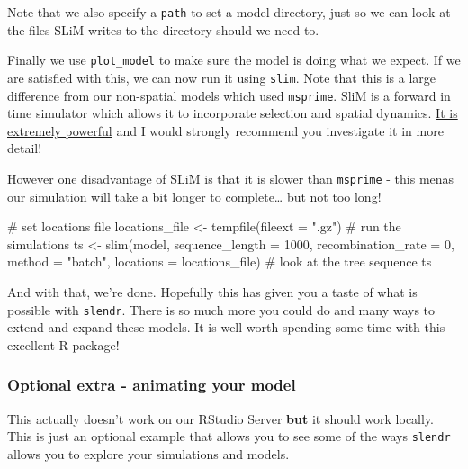 \documentclass[
  letterpaper,
  DIV=11,
  numbers=noendperiod]{scrartcl}
\newenvironment{Shaded}{\begin{snugshade}}{\end{snugshade}}
\newcommand{\AttributeTok}[1]{\textcolor[rgb]{0.40,0.45,0.13}{#1}}
\newcommand{\CommentTok}[1]{\textcolor[rgb]{0.37,0.37,0.37}{#1}}
\newcommand{\DecValTok}[1]{\textcolor[rgb]{0.68,0.00,0.00}{#1}}
\newcommand{\FunctionTok}[1]{\textcolor[rgb]{0.28,0.35,0.67}{#1}}
\newcommand{\NormalTok}[1]{\textcolor[rgb]{0.00,0.23,0.31}{#1}}
\newcommand{\OtherTok}[1]{\textcolor[rgb]{0.00,0.23,0.31}{#1}}
\newcommand{\StringTok}[1]{\textcolor[rgb]{0.13,0.47,0.30}{#1}}
\begin{document}
Note that we also specify a \texttt{path} to set a model directory, just
so we can look at the files SLiM writes to the directory should we need
to.

Finally we use \texttt{plot\_model} to make sure the model is doing what
we expect. If we are satisfied with this, we can now run it using
\texttt{slim}. Note that this is a large difference from our non-spatial
models which used \texttt{msprime}. SliM is a forward in time simulator
which allows it to incorporate selection and spatial dynamics.
\href{https://messerlab.org/slim/}{It is extremely powerful} and I would
strongly recommend you investigate it in more detail!

However one disadvantage of SLiM is that it is slower than
\texttt{msprime} - this menas our simulation will take a bit longer to
complete\ldots{} but not too long!

\begin{Shaded}
\begin{Highlighting}[]
\CommentTok{\# set locations file}
\NormalTok{locations\_file }\OtherTok{\textless{}{-}} \FunctionTok{tempfile}\NormalTok{(}\AttributeTok{fileext =} \StringTok{".gz"}\NormalTok{)}
\CommentTok{\# run the simulations}
\NormalTok{ts }\OtherTok{\textless{}{-}} \FunctionTok{slim}\NormalTok{(model, }\AttributeTok{sequence\_length =} \DecValTok{1000}\NormalTok{, }\AttributeTok{recombination\_rate =} \DecValTok{0}\NormalTok{, }\AttributeTok{method =} \StringTok{"batch"}\NormalTok{,}
           \AttributeTok{locations =}\NormalTok{ locations\_file)}
\CommentTok{\# look at the tree sequence}
\NormalTok{ts}
\end{Highlighting}
\end{Shaded}

And with that, we're done. Hopefully this has given you a taste of what
is possible with \texttt{slendr}. There is so much more you could do and
many ways to extend and expand these models. It is well worth spending
some time with this excellent R package!

\hypertarget{optional-extra---animating-your-model}{%
\subsubsection{Optional extra - animating your
model}\label{optional-extra---animating-your-model}}

This actually doesn't work on our RStudio Server \textbf{but} it should
work locally. This is just an optional example that allows you to see
some of the ways \texttt{slendr} allows you to explore your simulations
and models.
\end{document}
